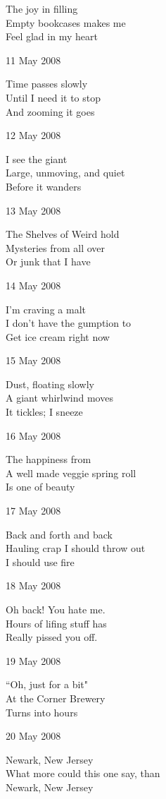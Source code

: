 \documentclass[12pt]{article}
\begin{document}
The joy in filling \\
Empty bookcases makes me \\
Feel glad in my heart

\newpage

11 May 2008

Time passes slowly \\
Until I need it to stop \\
And zooming it goes

12 May 2008

I see the giant \\
Large, unmoving, and quiet \\
Before it wanders

13 May 2008

The Shelves of Weird hold \\
Mysteries from all over \\
Or junk that I have

14 May 2008

I'm craving a malt \\
I don't have the gumption to \\
Get ice cream right now

15 May 2008

Dust, floating slowly \\
A giant whirlwind moves \\
It tickles; I sneeze

16 May 2008 

The happiness from \\
A well made veggie spring roll \\
Is one of beauty

17 May 2008

Back and forth and back \\
Hauling crap I should throw out \\
I should use fire

\newpage

18 May 2008

Oh back! You hate me. \\
Hours of lifing stuff has \\
Really pissed you off.

19 May 2008

``Oh, just for a bit" \\
At the Corner Brewery \\
Turns into hours

20 May 2008

Newark, New Jersey \\
What more could this one say, than \\
Newark, New Jersey
\end{document}
